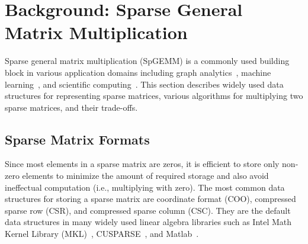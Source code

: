 

\section{Background: Sparse General Matrix Multiplication}
\label{sec-spz-spgemm-background}

Sparse general matrix multiplication (SpGEMM) is a commonly used building block
in various application domains including graph
analytics~\cite{davis-graphblas-tmos2019,hoefler2011generic,shun-multicore-tc-2015},
machine
learning~\cite{reddi-mlperf-isca2020,naumov-dnn-model-arxiv2019,han-deep-compress-arxiv2015,jouppi-datacenter-isca2017,wu-ml-facebook-hpca2019},
and scientific computing~\cite{canning-sparse-sim-1996,galli-quantum-sim-1996}.
This section describes widely used data structures for representing sparse
matrices, various algorithms for multiplying two sparse matrices, and their
trade-offs.


\subsection{Sparse Matrix Formats}


Since most elements in a sparse matrix are zeros, it is efficient to store only
non-zero elements to minimize the amount of required storage and also avoid
ineffectual computation (i.e., multiplying with zero).
The most common data structures for storing a sparse matrix are coordinate
format (COO), compressed sparse row (CSR), and compressed sparse column (CSC).
They are the default data structures in many widely used linear algebra
libraries such as Intel Math Kernel Library (MKL)~\cite{wang-intel-mkl-2014},
CUSPARSE~\cite{naumov-cusparse-2010}, and
Matlab~\cite{gilbert-sparse-matlab-1992}.

